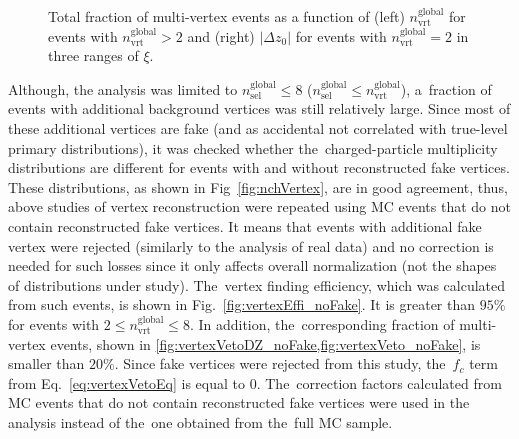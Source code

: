 \begin{figure}[h!]
\begin{subfigure}{.47\textwidth}
	\end{subfigure}
	\caption{Total fraction of multi-vertex events as a function of (left) $n_\textrm{vrt}^\textrm{global}$ for events with $n^\textrm{global}_\textrm{vrt}>2$ and (right) $|\Delta z_0|$ for events with $n^\textrm{global}_\textrm{vrt}=2$  in three ranges of $\xi$.}
	\label{fig:vertexVetoDZ}
\end{figure}
Although, the analysis was limited to $n_\textrm{sel}^\textrm{global}\leq8$ ($n_\textrm{sel}^\textrm{global}\leq n_\textrm{vrt}^\textrm{global}$), a~fraction  of events  with additional background vertices was still relatively large.
Since most of these additional vertices are fake (and as accidental not correlated with true-level primary distributions), it was checked whether the~charged-particle multiplicity distributions are different for events with and without reconstructed fake vertices. These distributions, as shown in Fig~\ref{fig:nchVertex}, are in good agreement, thus, above studies of vertex reconstruction were repeated using \ac{MC} events that do not contain reconstructed fake vertices. It means that events with additional fake vertex  were rejected (similarly to the analysis of real data) and no correction is needed for such losses  since it only affects overall normalization (not the shapes of distributions under study). The~vertex finding efficiency, which was  calculated from such events, is shown in Fig.~\ref{fig:vertexEffi_noFake}. It is greater than $95\%$ for events with $2 \leq n_\textrm{vrt}^\textrm{global}\leq 8$. 
  In addition, the~corresponding fraction of multi-vertex events, shown in \cref{fig:vertexVetoDZ_noFake,fig:vertexVeto_noFake}, is smaller than $20\%$. Since fake vertices were rejected from this study, the~$f_{c}$ term from Eq.~\eqref{eq:vertexVetoEq} is equal to $0$. The~correction factors calculated from \ac{MC} events that do not contain reconstructed fake vertices  were used in the analysis instead of the~one obtained from the~full \ac{MC} sample.

